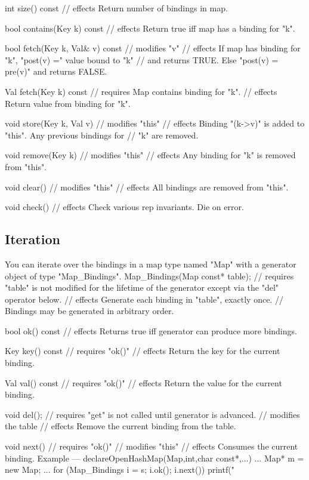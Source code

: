 int size() const
    // effects   Return number of bindings in map.

bool contains(Key k) const
    // effects   Return true iff map has a binding for "k".

bool fetch(Key k, Val& v) const
    // modifies  "v"
    // effects   If map has binding for "k", "post(v) =" value bound to "k"
    //		 and returns TRUE.  Else "post(v) = pre(v)" and returns FALSE.

Val fetch(Key k) const
    // requires  Map contains binding for "k".
    // effects	 Return value from binding for "k".

void store(Key k, Val v)
    // modifies  "this"
    // effects	 Binding "(k->v)" is added to "this". Any previous bindings for
    //		 "k" are removed.

void remove(Key k)
    // modifies  "this"
    // effects	 Any binding for "k" is removed from "this".

void clear()
    // modifies  "this"
    // effects	 All bindings are removed from "this".

void check()
    // effects   Check various rep invariants.  Die on error.

\subsection{Iteration}

You can iterate over the bindings in a map type named "Map" with a generator
object of type "Map\_Bindings".
Map_Bindings(Map const* table);
    // requires  "table" is not modified for the lifetime of the generator
                 except via the "del" operator below.
    // effects   Generate each binding in "table", exactly once.
    //	         Bindings may be generated in arbitrary order.

bool ok() const
    // effects   Returns true iff generator can produce more bindings.

Key key() const
    // requires  "ok()"
    // effects   Return the key for the current binding.

Val val() const
    // requires  "ok()"
    // effects   Return the value for the current binding.

void del();
    // requires "get" is not called until generator is advanced.
    // modifies the table
    // effects  Remove the current binding from the table.

void next()
    // requires  "ok()"
    // modifies  "this"
    // effects   Consumes the current binding.
Example ---
declareOpenHashMap(Map,int,char const*,...)
...
Map* m = new Map;
...
for (Map_Bindings i = s; i.ok(); i.next())
    printf("%


